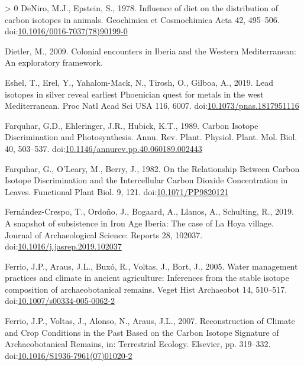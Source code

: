 \documentclass[3p]{elsarticle} %
\newlength{\cslhangindent}
\newenvironment{CSLReferences}[3] %
 {%
  \setlength{\parindent}{0pt}
  \ifodd #1 \everypar{\setlength{\hangindent}{\cslhangindent}}\ignorespaces\fi
  \ifnum #2 > 0
  \setlength{\parskip}{#2\baselineskip}
  \fi
 }%
 {}
\begin{document}
\begin{CSLReferences}{1}{0}
\leavevmode\hypertarget{ref-deniro_epstein78}{}%
DeNiro, M.J., Epstein, S., 1978. Influence of diet on the distribution of carbon isotopes in animals. Geochimica et Cosmochimica Acta 42, 495--506. doi:\href{https://doi.org/10.1016/0016-7037(78)90199-0}{10.1016/0016-7037(78)90199-0}

\leavevmode\hypertarget{ref-dietler09}{}%
Dietler, M., 2009. Colonial encounters in {Iberia} and the {Western Mediterranean}: {An} exploratory framework.

\leavevmode\hypertarget{ref-eshel_etal19}{}%
Eshel, T., Erel, Y., Yahalom-Mack, N., Tirosh, O., Gilboa, A., 2019. Lead isotopes in silver reveal earliest {Phoenician} quest for metals in the west {Mediterranean}. Proc Natl Acad Sci USA 116, 6007. doi:\href{https://doi.org/10.1073/pnas.1817951116}{10.1073/pnas.1817951116}

\leavevmode\hypertarget{ref-farquhar_etal89}{}%
Farquhar, G.D., Ehleringer, J.R., Hubick, K.T., 1989. Carbon {Isotope Discrimination} and {Photosynthesis}. Annu. Rev. Plant. Physiol. Plant. Mol. Biol. 40, 503--537. doi:\href{https://doi.org/10.1146/annurev.pp.40.060189.002443}{10.1146/annurev.pp.40.060189.002443}

\leavevmode\hypertarget{ref-farquhar_etal82}{}%
Farquhar, G., O'Leary, M., Berry, J., 1982. On the {Relationship Between Carbon Isotope Discrimination} and the {Intercellular Carbon Dioxide Concentration} in {Leaves}. Functional Plant Biol. 9, 121. doi:\href{https://doi.org/10.1071/PP9820121}{10.1071/PP9820121}

\leavevmode\hypertarget{ref-fernandez-crespo_etal19}{}%
Fernández-Crespo, T., Ordoño, J., Bogaard, A., Llanos, A., Schulting, R., 2019. A snapshot of subsistence in {Iron Age Iberia}: {The} case of {La Hoya} village. Journal of Archaeological Science: Reports 28, 102037. doi:\href{https://doi.org/10.1016/j.jasrep.2019.102037}{10.1016/j.jasrep.2019.102037}

\leavevmode\hypertarget{ref-ferrio_etal05}{}%
Ferrio, J.P., Araus, J.L., Buxó, R., Voltas, J., Bort, J., 2005. Water management practices and climate in ancient agriculture: Inferences from the stable isotope composition of archaeobotanical remains. Veget Hist Archaeobot 14, 510--517. doi:\href{https://doi.org/10.1007/s00334-005-0062-2}{10.1007/s00334-005-0062-2}

\leavevmode\hypertarget{ref-ferrio_etal07}{}%
Ferrio, J.P., Voltas, J., Alonso, N., Araus, J.L., 2007. Reconstruction of {Climate} and {Crop Conditions} in the {Past Based} on the {Carbon Isotope Signature} of {Archaeobotanical Remains}, in: Terrestrial {Ecology}. {Elsevier}, pp. 319--332. doi:\href{https://doi.org/10.1016/S1936-7961(07)01020-2}{10.1016/S1936-7961(07)01020-2}


\end{CSLReferences}
\end{document}
